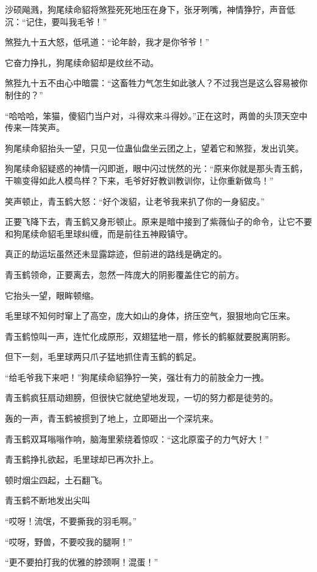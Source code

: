 \begin{this_body}
沙硕飚溅，狗尾续命貂将煞狴死死地压在身下，张牙咧嘴，神情狰狞，声音低沉：“记住，要叫我毛爷！”

煞狴九十五大怒，低吼道：“论年龄，我才是你爷爷！”

它奋力挣扎，狗尾续命貂却是纹丝不动。

煞狴九十五不由心中暗震：“这畜牲力气怎生如此骇人？不过我岂是这么容易被你制住的？”

“哈哈哈，笨猫，傻貂门当户对，斗得欢来斗得妙。”正在这时，两兽的头顶天空中传来一阵笑声。

狗尾续命貂抬头一望，只见一位蛊仙盘坐云团之上，望着它和煞狴，发出讥笑。

狗尾续命貂疑惑的神情一闪即逝，眼中闪过恍然的光：“原来你就是那头青玉鹤，干嘛变得如此人模鸟样？下来，毛爷好好教训教训你，让你重新做鸟！”

笑声顿止，青玉鹤大怒：“好个泼貂，让老爷我来扒了你的一身貂皮。”

正要飞降下去，青玉鹤又身形顿止。原来是暗中接到了紫薇仙子的命令，让它不要和狗尾续命貂毛里球纠缠，而是前往五神殿镇守。

真正的劫运坛虽然还未显露踪迹，但前进的路线是确定的。

青玉鹤领命，正要离去，忽然一阵庞大的阴影覆盖住它的前方。

它抬头一望，眼眸顿缩。

毛里球不知何时窜上了高空，庞大如山的身体，挤压空气，狠狠地向它压来。

青玉鹤惊叫一声，连忙化成原形，双翅猛地一扇，修长的鹤躯就要脱离阴影。

但下一刻，毛里球两只爪子猛地抓住青玉鹤的鹤足。

“给毛爷我下来吧！”狗尾续命貂狰狞一笑，强壮有力的前肢全力一拽。

青玉鹤疯狂扇动翅膀，但很快它就绝望地发现，一切的努力都是徒劳的。

轰的一声，青玉鹤被掼到了地上，立即砸出一个深坑来。

青玉鹤双耳嗡嗡作响，脑海里萦绕着惊叹：“这北原蛮子的力气好大！”

青玉鹤挣扎欲起，毛里球却已再次扑上。

顿时烟尘四起，土石翻飞。

青玉鹤不断地发出尖叫

“哎呀！流氓，不要撕我的羽毛啊。”

“哎呀，野兽，不要咬我的腿啊！”

“更不要拍打我的优雅的脖颈啊！混蛋！”


\end{this_body}
